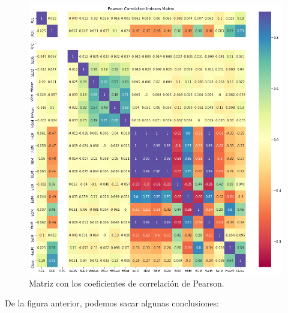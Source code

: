 \documentclass[11pt,a4paper]{article}
\begin{document}
\begin{figure}[H]
    \centering
    \includegraphics[scale=0.4]{img/correlation.png}
    \caption{Matriz con los coeficientes de correlación de Pearson.}
    \label{fig:pearson}
\end{figure}

De la figura anterior, podemos sacar algunas conclusiones:
\end{document}
